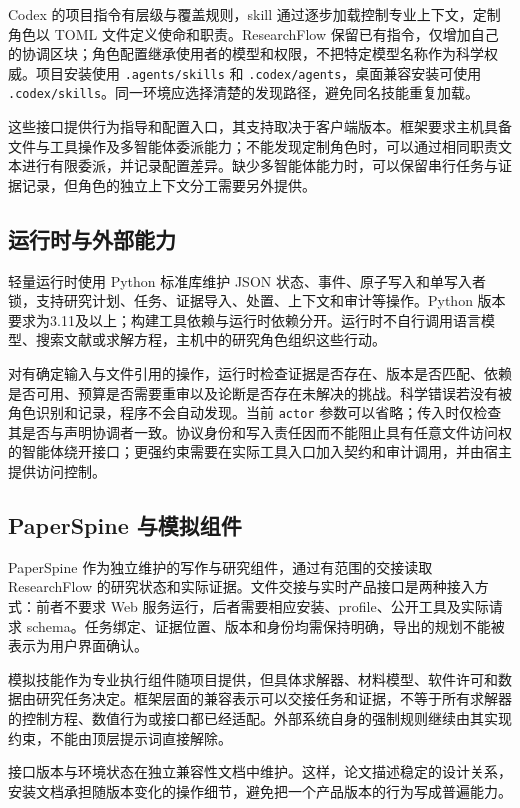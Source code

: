 \documentclass[UTF8,fontset=fandol,a4paper,11pt]{ctexart}
\begin{document}
Codex 的项目指令有层级与覆盖规则，skill 通过逐步加载控制专业上下文，定制角色以 TOML 文件定义使命和职责\cite{r6,r7,r8}。ResearchFlow 保留已有指令，仅增加自己的协调区块；角色配置继承使用者的模型和权限，不把特定模型名称作为科学权威。项目安装使用 \texttt{.agents/skills} 和 \texttt{.codex/agents}，桌面兼容安装可使用 \texttt{.codex/skills}。同一环境应选择清楚的发现路径，避免同名技能重复加载。

这些接口提供行为指导和配置入口，其支持取决于客户端版本。框架要求主机具备文件与工具操作及多智能体委派能力；不能发现定制角色时，可以通过相同职责文本进行有限委派，并记录配置差异。缺少多智能体能力时，可以保留串行任务与证据记录，但角色的独立上下文分工需要另外提供。

\subsection{运行时与外部能力}

轻量运行时使用 Python 标准库维护 JSON 状态、事件、原子写入和单写入者锁，支持研究计划、任务、证据导入、处置、上下文和审计等操作。Python 版本要求为3.11及以上；构建工具依赖与运行时依赖分开。运行时不自行调用语言模型、搜索文献或求解方程，主机中的研究角色组织这些行动。

对有确定输入与文件引用的操作，运行时检查证据是否存在、版本是否匹配、依赖是否可用、预算是否需要重审以及论断是否存在未解决的挑战。科学错误若没有被角色识别和记录，程序不会自动发现。当前 \texttt{actor} 参数可以省略；传入时仅检查其是否与声明协调者一致。协议身份和写入责任因而不能阻止具有任意文件访问权的智能体绕开接口；更强约束需要在实际工具入口加入契约和审计调用，并由宿主提供访问控制。

\subsection{PaperSpine 与模拟组件}

PaperSpine 作为独立维护的写作与研究组件，通过有范围的交接读取 ResearchFlow 的研究状态和实际证据\cite{r9}。文件交接与实时产品接口是两种接入方式：前者不要求 Web 服务运行，后者需要相应安装、profile、公开工具及实际请求 schema。任务绑定、证据位置、版本和身份均需保持明确，导出的规划不能被表示为用户界面确认。

模拟技能作为专业执行组件随项目提供，但具体求解器、材料模型、软件许可和数据由研究任务决定。框架层面的兼容表示可以交接任务和证据，不等于所有求解器的控制方程、数值行为或接口都已经适配。外部系统自身的强制规则继续由其实现约束，不能由顶层提示词直接解除。

接口版本与环境状态在独立兼容性文档中维护。这样，论文描述稳定的设计关系，安装文档承担随版本变化的操作细节，避免把一个产品版本的行为写成普遍能力。
\end{document}
